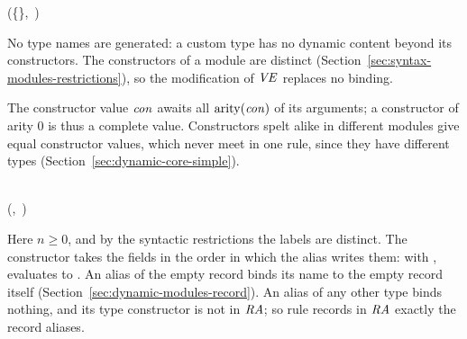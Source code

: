 
  {
     {(\{\tycon\mapsto\VE\}\opt{+\,\dmCE},\ \VE{})}}

\begin{rulecomments}
 No type names are generated: a custom type has no
dynamic content beyond its constructors. The constructors of a module are
distinct (Section~\ref{sec:syntax-modules-restrictions}), so the
modification of $\mathit{VE}$ replaces no binding.
\end{rulecomments}


  {\jdg{}{\con\ \opt{\kw{|}\ \conbind}}{\{\con\mapsto\con\}\opt{+\,\VE}}}

\begin{rulecomments}
 The constructor value $\mathit{con}$ awaits all
$\mathrm{arity}(\mathit{con})$ of its arguments; a constructor of arity 0 is thus a complete
value. Constructors spelt alike in different modules give equal constructor
values, which never meet in one rule, since they have different types
(Section~\ref{sec:dynamic-core-simple}).
\end{rulecomments}


  {\vdash\tycon\ \\
     \Rightarrow(\emptyset\opt{\cup\,\{\tycon\}},\ \emptymap{})}

\begin{rulecomments}
 Here $n\geq 0$, and by the syntactic restrictions
the labels are distinct. The constructor takes the fields in the order in
which the alias writes them: with ,
 evaluates to . An alias of the empty record
binds its name to the empty record itself
(Section~\ref{sec:dynamic-modules-record}). An alias of any other type binds
nothing, and its type constructor is not in $\mathit{RA}$; so rule
 records in $\mathit{RA}$ exactly the record aliases.
\end{rulecomments}

